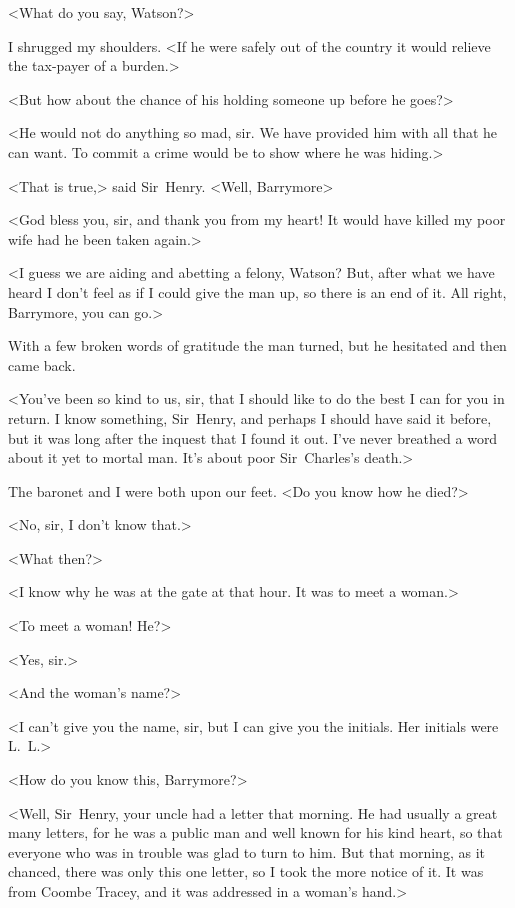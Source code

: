 <What do you say, Watson?>

I shrugged my shoulders. <If he were safely out of the country it would relieve the tax-payer of a burden.>

<But how about the chance of his holding someone up before he goes?>

<He would not do anything so mad, sir. We have provided him with all that he can want. To commit a crime would be to show where he was hiding.>

<That is true,> said Sir~Henry. <Well, Barrymore\longdash>



<God bless you, sir, and thank you from my heart! It would have killed my poor wife had he been taken again.>

<I guess we are aiding and abetting a felony, Watson? But, after what we have heard I don't feel as if I could give the man up, so there is an end of it. All right, Barrymore, you can go.>

With a few broken words of gratitude the man turned, but he hesitated and then came back.

<You've been so kind to us, sir, that I should like to do the best I can for you in return. I know something, Sir~Henry, and perhaps I should have said it before, but it was long after the inquest that I found it out. I've never breathed a word about it yet to mortal man. It's about poor Sir~Charles's death.>

The baronet and I were both upon our feet. <Do you know how he died?>

<No, sir, I don't know that.>

<What then?>

<I know why he was at the gate at that hour. It was to meet a woman.>

<To meet a woman! He?>

<Yes, sir.>

<And the woman's name?>

<I can't give you the name, sir, but I can give you the initials. Her initials were L\@.~L\@.>

<How do you know this, Barrymore?>

<Well, Sir~Henry, your uncle had a letter that morning. He had usually a great many letters, for he was a public man and well known for his kind heart, so that everyone who was in trouble was glad to turn to him. But that morning, as it chanced, there was only this one letter, so I took the more notice of it. It was from Coombe Tracey, and it was addressed in a woman's hand.>

